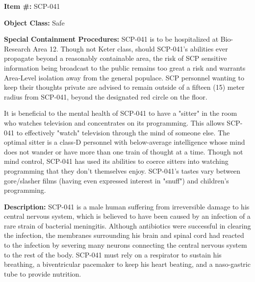 
\textbf{Item \#:} SCP-041

\textbf{Object Class:} Safe

\textbf{Special Containment Procedures:} SCP-041 is to be hospitalized at Bio-Research Area 12. Though not Keter class, should SCP-041's abilities ever propagate beyond a reasonably containable area, the risk of SCP sensitive information being broadcast to the public remains too great a risk and warrants Area-Level isolation away from the general populace. SCP personnel wanting to keep their thoughts private are advised to remain outside of a fifteen (15) meter radius from SCP-041, beyond the designated red circle on the floor.

It is beneficial to the mental health of SCP-041 to have a "sitter" in the room who watches television and concentrates on its programming. This allows SCP-041 to effectively "watch" television through the mind of someone else. The optimal sitter is a class-D personnel with below-average intelligence whose mind does not wander or have more than one train of thought at a time. Though not mind control, SCP-041 has used its abilities to coerce sitters into watching programming that they don't themselves enjoy. SCP-041's tastes vary between gore/slasher films (having even expressed interest in "snuff") and children's programming.

\textbf{Description:} SCP-041 is a male human suffering from irreversible damage to his central nervous system, which is believed to have been caused by an infection of a rare strain of bacterial meningitis. Although antibiotics were successful in clearing the infection, the membranes surrounding his brain and spinal cord had reacted to the infection by severing many neurons connecting the central nervous system to the rest of the body. SCP-041 must rely on a respirator to sustain his breathing, a biventricular pacemaker to keep his heart beating, and a naso-gastric tube to provide nutrition.

